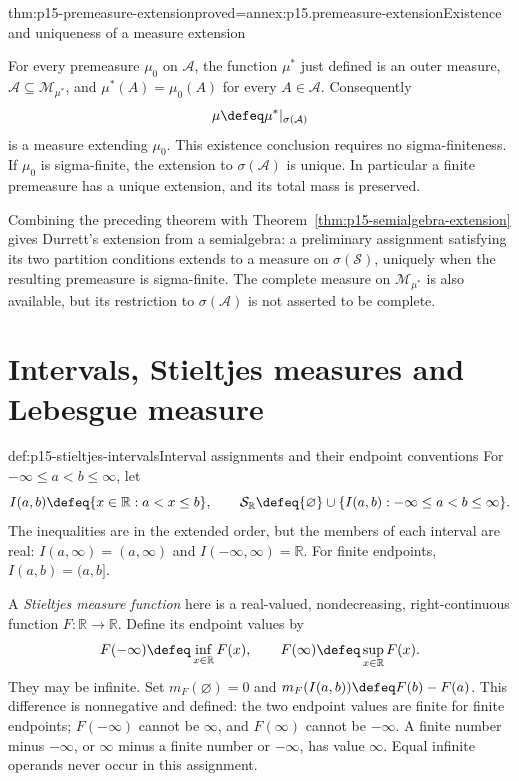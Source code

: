 \begin{hbtheorem}{thm:p15-premeasure-extension}{proved=annex:p15.premeasure-extension}{Existence and uniqueness of a measure extension}
\par\nobreak
For every premeasure \(\mu_0\) on \(\mathcal A\), the function
\(\mu^*\) just defined is an outer measure,
\(\mathcal A\subseteq\mathcal M_{\mu^*}\), and
\(\mu^*(A)=\mu_0(A)\) for every \(A\in\mathcal A\).
Consequently
\[
 \mu\defeq\mu^*|_{\sigma(\mathcal A)}
\]
is a measure extending \(\mu_0\). This existence conclusion requires
no sigma-finiteness. If \(\mu_0\) is sigma-finite, the extension to
\(\sigma(\mathcal A)\) is unique. In particular a finite premeasure
has a unique extension, and its total mass is preserved.
\end{hbtheorem}

Combining the preceding theorem with
Theorem~\ref{thm:p15-semialgebra-extension} gives Durrett's extension
from a semialgebra: a preliminary assignment satisfying its two partition
conditions extends to a measure on \(\sigma(\mathcal S)\), uniquely
when the resulting premeasure is sigma-finite. The complete measure on
\(\mathcal M_{\mu^*}\) is also available, but its restriction to
\(\sigma(\mathcal A)\) is not asserted to be complete.

\section{Intervals, Stieltjes measures and Lebesgue measure}
\label{sec:p15-stieltjes-lebesgue}

\begin{hbdefinition}{def:p15-stieltjes-intervals}{Interval assignments and their endpoint conventions}
For \(-\infty\leq a<b\leq\infty\), let
\[
 I(a,b)\defeq\{x\in\mathbb R:a<x\leq b\},\qquad
 \mathcal S_{\mathbb R}\defeq
       \{\varnothing\}\cup\{I(a,b):-\infty\leq a<b\leq\infty\}.
\]
The inequalities are in the extended order, but the members of each
interval are real: \(I(a,\infty)=(a,\infty)\) and
\(I(-\infty,\infty)=\mathbb R\). For finite endpoints,
\(I(a,b)=(a,b]\).

A \emph{Stieltjes measure function} here is a real-valued,
nondecreasing, right-continuous function \(F:\mathbb R\to\mathbb R\).
Define its endpoint values by
\[
 F(-\infty)\defeq\inf_{x\in\mathbb R}F(x),\qquad
 F(\infty)\defeq\sup_{x\in\mathbb R}F(x).
\]
They may be infinite. Set \(m_F(\varnothing)=0\) and
\(m_F(I(a,b))\defeq F(b)-F(a)\). This difference is nonnegative
and defined: the two endpoint values are finite for finite endpoints;
\(F(-\infty)\) cannot be \(\infty\), and \(F(\infty)\) cannot
be \(-\infty\). A finite number minus \(-\infty\), or
\(\infty\) minus a finite number or \(-\infty\), has value
\(\infty\). Equal infinite operands never occur in this assignment.
\end{hbdefinition}

